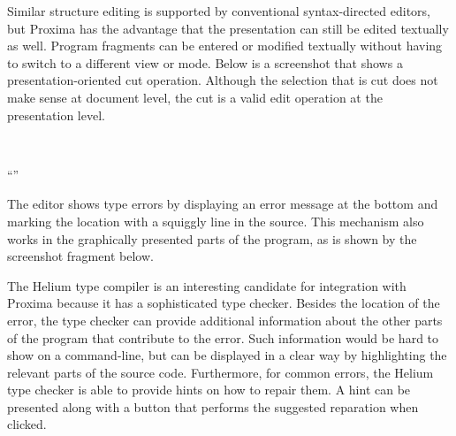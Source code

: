Similar structure editing is supported by conventional syntax-directed editors, but Proxima has the advantage that the presentation can still be edited textually as well. Program fragments can be entered or modified textually without having to switch to a different view or mode.  Below is a screenshot that shows a presentation-oriented cut operation. Although the selection that is cut does not make sense at document level, the cut is a valid edit operation at the presentation level.

\begin{center}
 \then
\nopagebreak[4] \\ [2mm]
\begin{small}
\hspace*{1.15cm}{\em cut} ``''
\end{small}
\end{center}



The editor shows type errors by displaying an error message at the bottom and marking the location with a squiggly line in the source. This mechanism also works in the graphically presented parts of the program, as is shown by the screenshot fragment below.


The Helium type compiler is an interesting candidate for integration with Proxima because it has a sophisticated type checker. Besides the location of the error, the type checker can provide additional information about the other parts of the program that contribute to the error. Such information would be hard to show on a command-line, but can be displayed in a clear way by highlighting the relevant parts of the source code. Furthermore, for common errors, the Helium type checker is able to provide hints on how to repair them. A hint can be presented along with a button that performs the suggested reparation when clicked.




